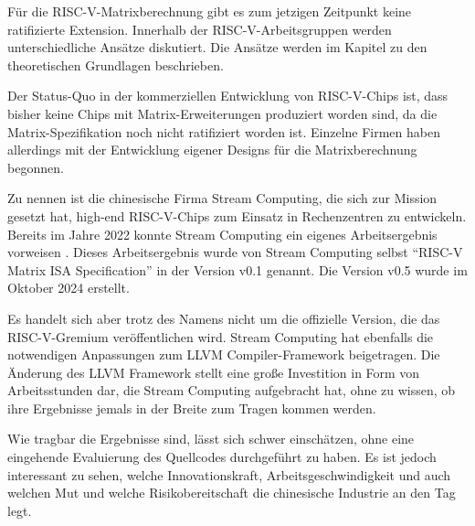 Für die RISC-V-Matrixberechnung gibt es zum jetzigen Zeitpunkt keine ratifizierte Extension. Innerhalb der RISC-V-Arbeitsgruppen werden unterschiedliche Ansätze diskutiert. Die Ansätze werden im Kapitel zu den theoretischen Grundlagen beschrieben.

Der Status-Quo in der kommerziellen Entwicklung von RISC-V-Chips ist, dass bisher keine Chips mit Matrix-Erweiterungen produziert worden sind, da die Matrix-Spezifikation noch nicht ratifiziert worden ist. Einzelne Firmen haben allerdings mit der Entwicklung eigener Designs für die Matrixberechnung begonnen.

Zu nennen ist die chinesische Firma Stream Computing, die sich zur Mission gesetzt hat, high-end RISC-V-Chips zum Einsatz in Rechenzentren zu entwickeln. Bereits im Jahre 2022 konnte Stream Computing ein eigenes Arbeitsergebnis vorweisen \cite{stream_computing_risc_v_matrix}. Dieses Arbeitsergebnis wurde von Stream Computing selbst ``RISC-V Matrix ISA Specification'' in der Version v0.1 genannt. Die Version v0.5 wurde im Oktober 2024 erstellt.

Es handelt sich aber trotz des Namens nicht um die offizielle Version, die das RISC-V-Gremium veröffentlichen wird. Stream Computing hat ebenfalls die notwendigen Anpassungen zum LLVM Compiler-Framework beigetragen. Die Änderung des LLVM Framework stellt eine große Investition in Form von Arbeitsstunden dar, die Stream Computing aufgebracht hat, ohne zu wissen, ob ihre Ergebnisse jemals in der Breite zum Tragen kommen werden.


Wie tragbar die Ergebnisse sind, lässt sich schwer einschätzen, ohne eine eingehende Evaluierung des Quellcodes durchgeführt zu haben. Es ist jedoch interessant zu sehen, welche Innovationskraft, Arbeitsgeschwindigkeit und auch welchen Mut und welche Risikobereitschaft die chinesische Industrie an den Tag legt.



